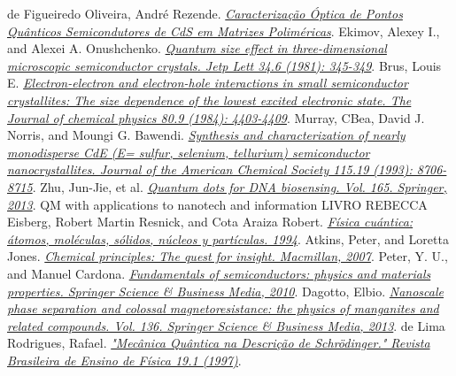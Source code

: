 \documentclass[11pt]{article}
\numberwithin{equation}{section}
\begin{document}
{}
\begin{thebibliography}{99}
 de Figueiredo Oliveira, André Rezende. \href{http://www.infis.ufu.br/sites/infis.ufu.br/files/Anexos/Bookpage/TCC%20F%C3%8DSICA%20DE%20MATERIAIS%202009_2%20-%20ANDRE%20REZENDE.pdf}
\textit{Caracterização Óptica de Pontos Quânticos Semicondutores de CdS em Matrizes Poliméricas}. 
 Ekimov, Alexey I., and Alexei A. Onushchenko. \href{https://www.researchgate.net/profile/Alexey_Onushchehko/publication/234289541_Quantum_Size_Effect_in_Three-Dimensional_Microscopic_Semiconductor_Crystals/links/0c9605305fa93c4e3d000000.pdf}\textit{Quantum size effect in three-dimensional microscopic semiconductor crystals. Jetp Lett 34.6 (1981): 345-349}.
 Brus, Louis E. \href{http://aip.scitation.org/doi/10.1063/1.447218}\textit{Electron-electron and electron-hole interactions in small semiconductor crystallites: The size dependence of the lowest excited electronic state. The Journal of chemical physics 80.9 (1984): 4403-4409}.
 Murray, CBea, David J. Norris, and Moungi G. Bawendi. \href{http://pubs.acs.org/doi/abs/10.1021/ja00072a025?journalCode=jacsat}\textit{Synthesis and characterization of nearly monodisperse CdE (E= sulfur, selenium, tellurium) semiconductor nanocrystallites. Journal of the American Chemical Society 115.19 (1993): 8706-8715}.
 Zhu, Jun-Jie, et al. \href{https://link.springer.com/book/10.1007/978-3-642-44910-9}\textit{Quantum dots for DNA biosensing. Vol. 165. Springer, 2013}.
 QM with applications to nanotech and information
 LIVRO REBECCA
  Eisberg, Robert Martin Resnick, and Cota Araiza Robert. \href{http://gen.lib.rus.ec/book/index.php?md5=80CCC290E6FFF645ADF0BA24178E4C5D}\textit{Física cuántica: átomos, moléculas, sólidos, núcleos y partículas. 1994}.
  Atkins, Peter, and Loretta Jones. \href{http://gen.lib.rus.ec/book/index.php?md5=6D32E94CECA0A9BD6FFF5F1307078071}\textit{Chemical principles: The quest for insight. Macmillan, 2007}.
  Peter, Y. U., and Manuel Cardona. \href{http://gen.lib.rus.ec/book/index.php?md5=20A8507AB491C812ED2C75D08740987A}\textit{Fundamentals of semiconductors: physics and materials properties. Springer Science \& Business Media, 2010}.
  Dagotto, Elbio. \href{http://gen.lib.rus.ec/book/index.php?md5=3C621FEBFE1EBBF8B376CED188D04A84}\textit{Nanoscale phase separation and colossal magnetoresistance: the physics of manganites and related compounds. Vol. 136. Springer Science \& Business Media, 2013}.
  de Lima Rodrigues, Rafael. \href{http://sbfisica.org.br/rbef/pdf/v19_68.pdf}\textit{"Mecânica Quântica na Descrição de Schrödinger." Revista Brasileira de Ensino de Física 19.1 (1997)}.
 \end{thebibliography}
\end{document}
